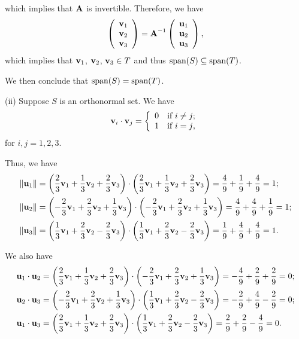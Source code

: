 \documentclass[12pt]{amsart}
\theoremstyle{plain}
\theoremstyle{definition}
\def\bf{\textbf}
\newcommand{\tu}{\textup}
\newcommand{\spa}{\textup{span}}
\newcommand{\norm}[1]{\left\| #1 \right\|}
\begin{document}
which implies that $\bf A$ is invertible. Therefore, we have
\begin{align*}
	\left(
	\begin{array}{c}
		\bf v_1\\
		\bf v_2\\
		\bf v_3
	\end{array}
	\right)=
	\bf A^{-1}
	\left(
	\begin{array}{c}
		\bf u_1\\
		\bf u_2\\
		\bf u_3
	\end{array}
	\right),
\end{align*}
which implies that $\bf v_1$, $\bf v_2$, $\bf v_3\in T$ and thus $\spa(S)\subseteq\spa(T)$. 

We then conclude that $\spa(S)=\spa(T)$.

(ii) Suppose $S$ is an orthonormal set. We have
\begin{align*}
	\bf v_i\cdot\bf v_j=\left\{
	\begin{array}{ll}
		0 & \tu{if $i\neq j$;}\\
		1 & \tu{if $i=j$,}
	\end{array}
	\right.
\end{align*}
for $i,j=1,2,3$.

Thus, we have
\begin{align*}
	\norm{\bf u_1}&=\left(\frac23\bf v_1+\frac13\bf v_2+\frac23\bf v_3\right)\cdot \left(\frac23\bf v_1+\frac13\bf v_2+\frac23\bf v_3\right)=\frac49+\frac19+\frac49=1;\\
	\norm{\bf u_2}&=\left(-\frac23\bf v_1+\frac23\bf v_2+\frac13\bf v_3\right)\cdot \left(-\frac23\bf v_1+\frac23\bf v_2+\frac13\bf v_3\right)=\frac49+\frac49+\frac19=1;\\
	\norm{\bf u_3}&=\left(\frac13\bf v_1+\frac23\bf v_2-\frac23\bf v_3\right)\cdot \left(\frac13\bf v_1+\frac23\bf v_2-\frac23\bf v_3\right)=\frac19+\frac49+\frac49=1.
\end{align*}

We also have
\begin{align*}
	\bf u_1\cdot\bf u_2&=\left(\frac23\bf v_1+\frac13\bf v_2+\frac23\bf v_3\right)\cdot\left(-\frac23\bf v_1+\frac23\bf v_2+\frac13\bf v_3\right)=-\frac49+\frac29+\frac29=0;\\
	\bf u_2\cdot\bf u_3&=\left(-\frac23\bf v_1+\frac23\bf v_2+\frac13\bf v_3\right)\cdot \left(\frac13\bf v_1+\frac23\bf v_2-\frac23\bf v_3\right)=-\frac29+\frac49-\frac29=0;\\
	\bf u_1\cdot \bf u_3&=\left(\frac23\bf v_1+\frac13\bf v_2+\frac23\bf v_3\right)\cdot\left(\frac13\bf v_1+\frac23\bf v_2-\frac23\bf v_3\right)=\frac29+\frac29-\frac49=0.
\end{align*}
\end{document}
